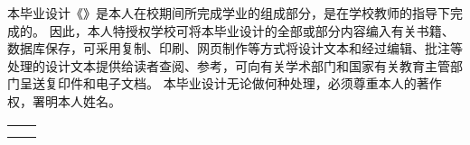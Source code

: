 
\begin{authorizationzh}
	
本毕业设计《\qquad \qquad \qquad \qquad \qquad \qquad \qquad \qquad \qquad \qquad \qquad》是本人在校期间所完成学业的组成部分，是在学校教师的指导下完成的。
因此，本人特授权学校可将本毕业设计的全部或部分内容编入有关书籍、数据库保存，可采用复制、印刷、网页制作等方式将设计文本和经过编辑、批注等处理的设计文本提供给读者查阅、参考，可向有关学术部门和国家有关教育主管部门呈送复印件和电子文档。
本毕业设计无论做何种处理，必须尊重本人的著作权，署明本人姓名。

	
	\vspace{30pt}
	\begin{tabular}{ll}
		\hspace{240pt} \makebox[4em][s]{设计作者（签字）：} & \underline{\makebox[100pt][c]{  }} \\
		\hspace{240pt} \makebox[4em][s]{日\qquad 期:}	 &
		\underline{\makebox[100pt][c]{\qquad 年\quad 月\quad   日 }} \\
	\end{tabular}

	
	
\end{authorizationzh}